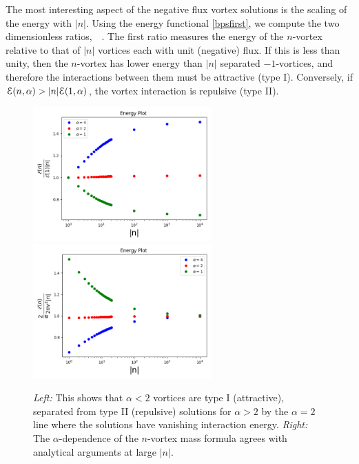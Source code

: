The most interesting aspect of the negative flux vortex solutions is the scaling of the energy with $|n|$. Using the energy functional \eqref{bpsfirst}, we compute the two dimensionless ratios,
\be
{}\, \qquad {} \quad{} \quad{}\,.\label{ratios}
\ee
The first ratio measures the energy of the $n$-vortex relative to that of $|n|$ vortices each with unit (negative) flux. If this is less than unity, then the $n$-vortex has lower energy than $|n|$ separated $-1$-vortices, and therefore the interactions between them must be attractive (type I). Conversely, if ${\cal E}(n, \alpha) > |n|{\cal E}(1, \alpha)$, the vortex interaction is repulsive (type II). 
\begin{figure}[H]
\begin{center}
 \includegraphics[width=2.70in]{Chapter_2_Folder_1912.11321/figures/bpsrationeg.png}\hspace{0.1in}
    \includegraphics[width=2.70in]{Chapter_2_Folder_1912.11321/figures/mass1neg.png}
    \caption[\textcolor{red}{This figure shows the energy per flux for different values of the coupling parameter $\alpha$.}]{{\small{\it Left:} This shows that $\alpha < 2$ vortices are type I (attractive), separated from type II (repulsive) solutions for $\alpha>2$ by the $\alpha=2$ line where the solutions have vanishing interaction energy. {\it Right:} The $\alpha$-dependence of the $n$-vortex mass formula agrees with analytical arguments at large $|n|$. }} \label{fig:massn1}
   \end{center}
\end{figure}
